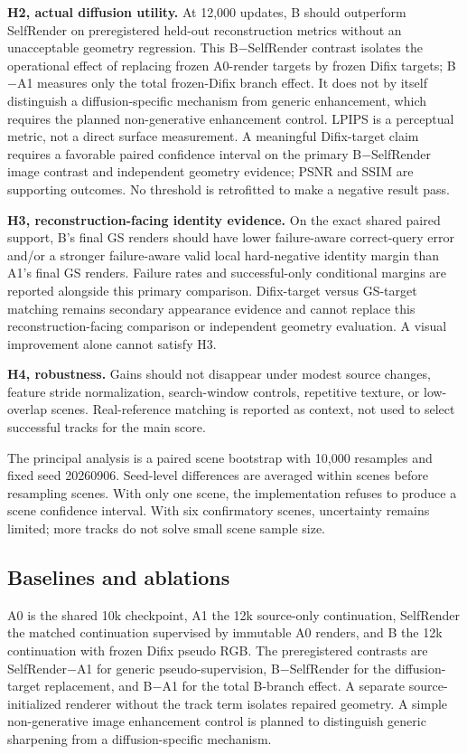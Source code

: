 \documentclass[10pt,twocolumn,letterpaper]{article}
\begin{document}
\textbf{H2, actual diffusion utility.} At 12,000 updates, B should outperform SelfRender on preregistered held-out reconstruction metrics without an unacceptable geometry regression. This B$-$SelfRender contrast isolates the operational effect of replacing frozen A0-render targets by frozen Difix targets; B$-$A1 measures only the total frozen-Difix branch effect. It does not by itself distinguish a diffusion-specific mechanism from generic enhancement, which requires the planned non-generative enhancement control. LPIPS is a perceptual metric, not a direct surface measurement. A meaningful Difix-target claim requires a favorable paired confidence interval on the primary B$-$SelfRender image contrast and independent geometry evidence; PSNR and SSIM are supporting outcomes. No threshold is retrofitted to make a negative result pass.

\textbf{H3, reconstruction-facing identity evidence.} On the exact shared paired support, B's final GS renders should have lower failure-aware correct-query error and/or a stronger failure-aware valid local hard-negative identity margin than A1's final GS renders. Failure rates and successful-only conditional margins are reported alongside this primary comparison. Difix-target versus GS-target matching remains secondary appearance evidence and cannot replace this reconstruction-facing comparison or independent geometry evaluation. A visual improvement alone cannot satisfy H3.

\textbf{H4, robustness.} Gains should not disappear under modest source changes, feature stride normalization, search-window controls, repetitive texture, or low-overlap scenes. Real-reference matching is reported as context, not used to select successful tracks for the main score.

The principal analysis is a paired scene bootstrap with 10,000 resamples and fixed seed 20260906. Seed-level differences are averaged within scenes before resampling scenes. With only one scene, the implementation refuses to produce a scene confidence interval. With six confirmatory scenes, uncertainty remains limited; more tracks do not solve small scene sample size.

\subsection{Baselines and ablations}
A0 is the shared 10k checkpoint, A1 the 12k source-only continuation, SelfRender the matched continuation supervised by immutable A0 renders, and B the 12k continuation with frozen Difix pseudo RGB. The preregistered contrasts are SelfRender$-$A1 for generic pseudo-supervision, B$-$SelfRender for the diffusion-target replacement, and B$-$A1 for the total B-branch effect. A separate source-initialized renderer without the track term isolates repaired geometry. A simple non-generative image enhancement control is planned to distinguish generic sharpening from a diffusion-specific mechanism.
\end{document}
